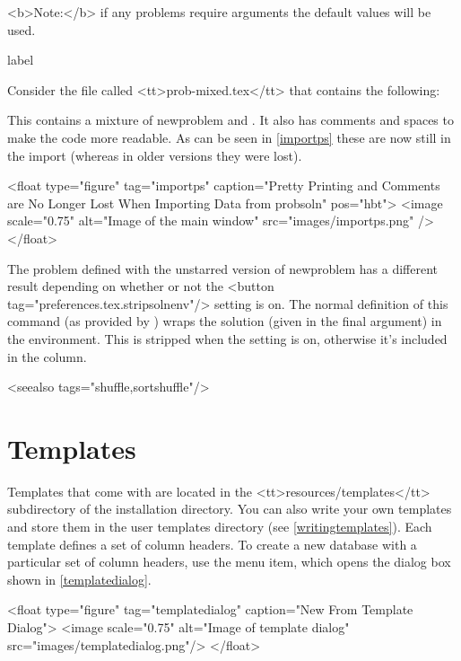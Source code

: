    <b>Note:</b> if any problems require arguments the default values 
   will be used.

\begin{example}{label}{}

   Consider the file called <tt>prob-mixed.tex</tt> that contains the 
   following:



   This contains a mixture of \gls{newproblem} and
   . It also has comments and spaces to make
   the code more readable. As can be seen in \autoref{importps}
   these are now still in the import (whereas in older versions they were lost).

     <float type="figure" tag="importps" caption="Pretty Printing and Comments are No Longer Lost When Importing Data from probsoln" pos="hbt">
      <image scale="0.75" alt="Image of the main window" src="images/importps.png" />
     </float>
\end{example}

   The problem defined with the unstarred version of \gls{newproblem}
   has a different result depending on whether or not the 
   <button tag="preferences.tex.stripsolnenv"/> setting is on. The 
   normal definition of this command (as provided by )
   wraps the solution (given in the final argument) in the 
    environment. This is stripped when the setting is
   on, otherwise it's included in the  column.

   <seealso tags="shuffle,sortshuffle"/>

\chapter{Templates}\label{templates}

   Templates that come with  are located in the <tt>resources/templates</tt>
   subdirectory of the  installation directory. You can also write
   your own templates and store them in the user templates directory 
   (see \autoref{writingtemplates}). Each template defines a set
   of column headers. To create a new database with a particular
   set of column headers, use the 
   menu item, which opens the dialog box shown in \autoref{templatedialog}.

   <float type="figure" tag="templatedialog" 
      caption="New From Template Dialog">
     <image scale="0.75" alt="Image of template dialog"
        src="images/templatedialog.png"/>
   </float>

